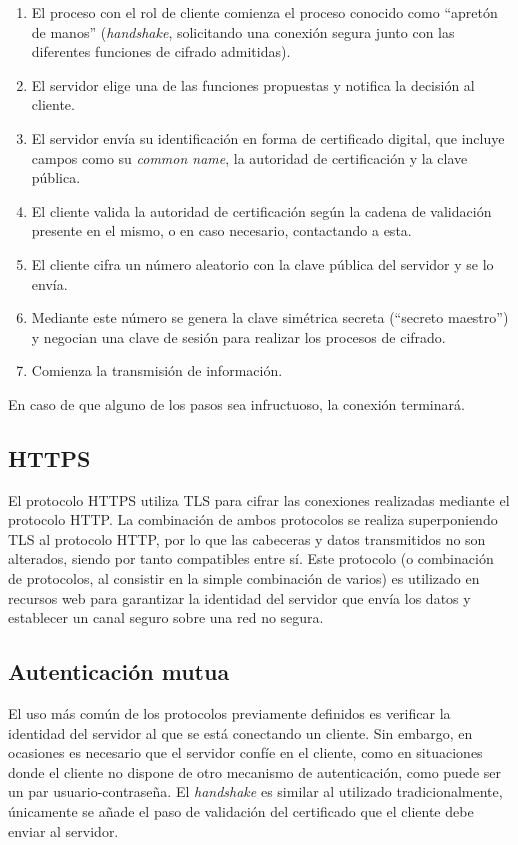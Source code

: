 \begin{enumerate}
\item El proceso con el rol de cliente comienza el proceso conocido como ``apretón de manos'' (\textit{handshake}, solicitando una conexión segura junto con las diferentes funciones de cifrado admitidas).
\item El servidor elige una de las funciones propuestas y notifica la decisión al cliente.
\item El servidor envía su identificación en forma de certificado digital, que incluye campos como su \textit{common name}, la autoridad de certificación y la clave pública.
\item El cliente valida la autoridad de certificación según la cadena de validación presente en el mismo, o en caso necesario, contactando a esta.
\item El cliente cifra un número aleatorio con la clave pública del servidor y se lo envía.
\item Mediante este número se genera la clave simétrica secreta (``secreto maestro'') y negocian una clave de sesión para realizar los procesos de cifrado.
\item Comienza la transmisión de información.
\end{enumerate}

En caso de que alguno de los pasos sea infructuoso, la conexión terminará. 

\subsection{HTTPS}

El protocolo HTTPS\cite{rfc2818} utiliza TLS para cifrar las conexiones realizadas mediante el protocolo HTTP. La combinación de ambos protocolos se realiza superponiendo TLS al protocolo HTTP, por lo que las cabeceras y datos transmitidos no son alterados, siendo por tanto compatibles entre sí. Este protocolo (o combinación de protocolos, al consistir en la simple combinación de varios) es utilizado en recursos web para garantizar la identidad del servidor que envía los datos y establecer un canal seguro sobre una red no segura.

\subsection{Autenticación mutua}
\label{teoria:autenticacionmutua}
El uso más común de los protocolos previamente definidos es verificar la identidad del servidor al que se está conectando un cliente. Sin embargo, en ocasiones es necesario que el servidor confíe en el cliente, como en situaciones donde el cliente no dispone de otro mecanismo de autenticación, como puede ser un par usuario-contraseña. El \textit{handshake} es similar al utilizado tradicionalmente, únicamente se añade el paso de validación del certificado que el cliente debe enviar al servidor.

